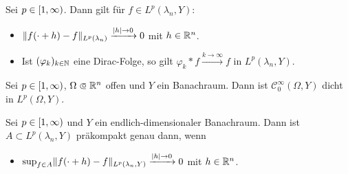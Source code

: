 \documentclass{cheat-sheet}
\newcommand{\convWith}[1]{\xrightarrow{#1 \to \infty}} %
\begin{document}
\begin{lem}
  Sei $p \in \left[ 1, \infty \right)$. Dann gilt für $f \in L^p(\lambda_n, Y)$:
  \begin{itemize}
    \item $\lVert f(\cdot + h) - f\rVert_{L^p(\lambda_n)} \xrightarrow{\lvert h\rvert \to 0} 0$ mit $h \in \mathbb{R}^n$.
    \item Ist $(\varphi_k)_{k \in \mathbb{N}}$ eine Dirac-Folge, so gilt $\varphi_k * f \convWith{k} f$ in $L^p(\lambda_n, Y)$.
  \end{itemize}
\end{lem}

\begin{satz}
  Sei $p \in \left[ 1, \infty \right)$, $\Omega \opn \R^n$ offen und $Y$ ein Banachraum. Dann ist $\mathcal{C}_0^\infty(\Omega, Y)$ dicht in $L^p(\Omega, Y)$.
\end{satz}


\begin{satz}[M. Riesz]
  Sei $p \in \left[ 1, \infty \right)$ und $Y$ ein endlich-dimensionaler Banachraum. Dann ist $A {\subset} L^p(\lambda_n, Y)$ präkompakt genau dann, wenn
  \begin{itemize}
    \item $\sup_{f \in A} \lVert f(\cdot + h) - f\rVert_{L^p(\lambda_n, Y)} \xrightarrow{\lvert h\rvert \to 0} 0$ mit $h \in \mathbb{R}^n$.
  \end{itemize}
\end{satz}

\end{document}
